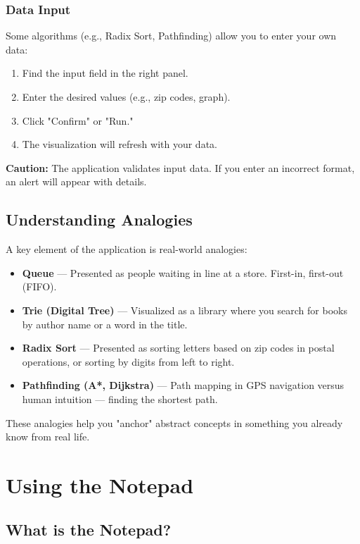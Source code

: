\subsubsection{Data Input}

Some algorithms (e.g., Radix Sort, Pathfinding) allow you to enter your own data:
\begin{enumerate}
  \item Find the input field in the right panel.
  \item Enter the desired values (e.g., zip codes, graph).
  \item Click "Confirm" or "Run."
  \item The visualization will refresh with your data.
\end{enumerate}

\textbf{Caution:} The application validates input data. If you enter an incorrect format, an alert will appear with details.

\subsection{Understanding Analogies}

A key element of the application is real-world analogies:

\begin{itemize}
  \item \textbf{Queue} — Presented as people waiting in line at a store. First-in, first-out (FIFO).
  \item \textbf{Trie (Digital Tree)} — Visualized as a library where you search for books by author name or a word in the title.
  \item \textbf{Radix Sort} — Presented as sorting letters based on zip codes in postal operations, or sorting by digits from left to right.
  \item \textbf{Pathfinding (A*, Dijkstra)} — Path mapping in GPS navigation versus human intuition — finding the shortest path.
\end{itemize}

These analogies help you "anchor" abstract concepts in something you already know from real life.

\section{Using the Notepad}

\subsection{What is the Notepad?}

